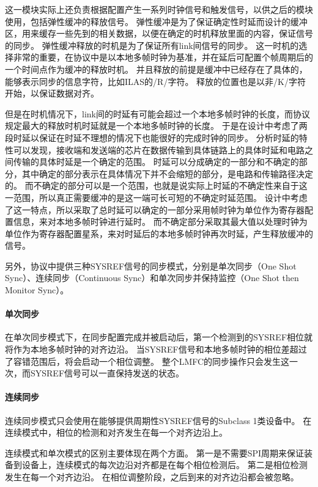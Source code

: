 \documentclass[UTF8]{ctexart}
\begin{document}
这一模块实际上还负责根据配置产生一系列时钟信号和触发信号，以供之后的模块使用，包括弹性缓冲的释放信号。
弹性缓冲是为了保证确定性时延而设计的缓冲区，用来缓存一些先到的相关数据，以便在确定的时机释放里面的内容，保证信号的同步。
弹性缓冲释放的时机是为了保证所有link间信号的同步。
这一时机的选择非常的重要，在协议中是以本地多帧时钟为基准，并在延后可配置个帧周期后的一个时间点作为缓冲的释放时机。
并且释放的前提是缓冲中已经存在了具体的，能够表示同步的信息字符，比如ILAS的/R/字符。
释放的位置也是以非/K/字符开始，以保证数据对齐。

但是在时机情况下，link间的时延有可能会超过一个本地多帧时钟的长度，而协议规定最大的释放时机时延就是一个本地多帧时钟的长度。
于是在设计中考虑了两段时延以保证在时延不理想的情况下也能很好的完成时钟的同步。
分析时延的特性可以发现，接收端和发送端的芯片在数据传输到具体链路上的具体时延和电路之间传输的具体时延是一个确定的范围。
时延可以分成确定的一部分和不确定的部分，其中确定的部分表示在具体情况下并不会缩短的部分，是电路和传输路径决定的。
而不确定的部分可以是一个范围，也就是说实际上时延的不确定性来自于这一范围，所以真正需要缓冲的是这一端可长可短的不确定时延范围。
设计中考虑了这一特点，所以采取了总时延可以确定的一部分采用帧时钟为单位作为寄存器配置信息，来对本地多帧时钟进行延时。
而不确定部分采取其最大值以处理时钟为单位作为寄存器配置星系，来对时延后的本地多帧时钟再次时延，产生释放缓冲的信号。

另外，协议中提供三种SYSREF信号的同步模式，分别是单次同步（One Shot Sync）、连续同步（Continuous Sync）和单次同步并保持监控（One Shot then Monitor Sync）。

\paragraph{单次同步}

在单次同步模式下，在同步配置完成并被启动后，第一个检测到的SYSREF相位就将作为本地多帧时钟的对齐边沿。
当SYSREF信号和本地多帧时钟的相位差超过了容错范围后，将会启动一个相位调整。
整个LMFC的同步操作只会发生这一次，而SYSREF信号可以一直保持发送的状态。

\paragraph{连续同步}

连续同步模式只会使用在能够提供周期性SYSREF信号的Subclass 1类设备中。
在连续模式中，相位的检测和对齐发生在每一个对齐边沿上。

连续模式和单次模式的区别主要体现在两个方面。
第一是不需要SPI周期来保证装备到设备上，连续模式的每次边沿对齐都是在每个相位检测后。
第二是相位检测发生在每一个对齐边沿。
在相位调整阶段，之后到来的对齐边沿都会被忽略。
\end{document}
